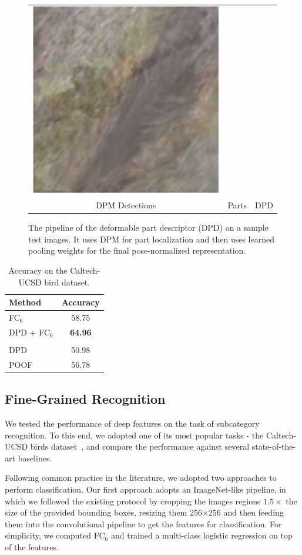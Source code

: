 \begin{figure}[t]
\begin{tabular}{ccc}
{\begin{minipage}{.2\linewidth}
\includegraphics[height=0.47\linewidth]{figs/decaf/bird_body}
\end{minipage}}\\
DPM Detections & Parts & DPD \\
\end{tabular}
\caption{The pipeline of the deformable part descriptor (DPD) on a sample test images. It uses DPM for part localization and then uses learned pooling weights for the final pose-normalized representation.}
\label{fig:birds}
\end{figure}

\begin{table}
\centering
\begin{tabular}{lc}
\toprule
Method & Accuracy\\
\midrule
FC$_6$  & 58.75 \\
DPD + FC$_6$ & {\bfseries 64.96} \\
\\
DPD \cite{dpd}& 50.98 \\
POOF \cite{poof}& 56.78 \\
\bottomrule
\end{tabular}
\caption{Accuracy on the Caltech-UCSD bird dataset.}
\label{table:birds}
\end{table}

\subsection{Fine-Grained Recognition}
We tested the performance of deep features on the task of subcategory recognition. To this end, we adopted one of its most popular tasks - the Caltech-UCSD birds dataset~\cite{birds}, and compare the performance against several state-of-the-art baselines.

Following common practice in the literature, we adopted two approaches to perform classification. Our first approach adopts an ImageNet-like pipeline, in which we followed the existing protocol by cropping the images regions $1.5\times$ the size of the provided bounding boxes, resizing them 256$\times$256 and then feeding them into the convolutional pipeline to get the features for classification. For simplicity, we computed FC$_6$ and trained a multi-class logistic regression on top of the features.

